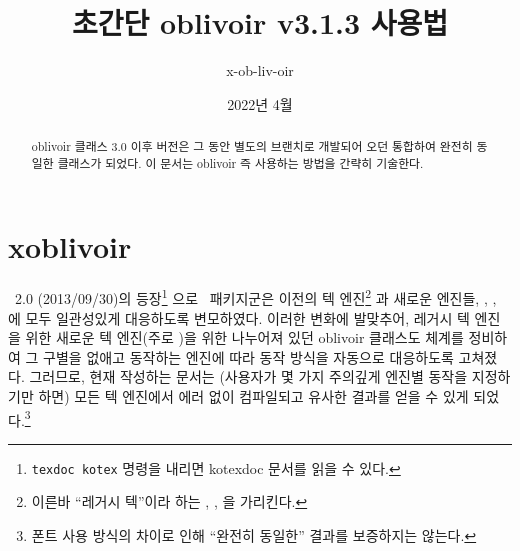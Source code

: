 \documentclass[
	12pt,
	a4paper,
	kosection,
	footnote,
	nobookmarks,
	microtype,
	figtabcapt,
]{oblivoir}
\newcommand\xobclass{x\-ob\-liv\-oir\oblivoirallowbreak}
\newcommand\obclass{ob\-liv\-oir\oblivoirallowbreak}
\begin{document}
\title{초간단 \obclass{} v3.1.3 사용법}

\date{2022년 4월}

\author{x-ob-liv-oir }

\maketitle

\begin{abstract}
\obclass{} 클래스 3.0 이후 버전은 그 동안 별도의 브랜치로 개발되어 오던
  통합하여 완전히 동일한 클래스가 되었다.
이 문서는 \obclass{} 즉 
사용하는 방법을 간략히 기술한다.
\end{abstract}

\tableofcontents*

\clearpage

\section{ \xobclass{}}


\koTeX\ 2.0 (2013/09/30)의 등장\footnote{%
	\texttt{texdoc kotex} 명령을 내리면 kotexdoc 문서를 읽을 수 있다.}%
으로 \koTeX\ 패키지군은 이전의 텍 엔진\footnote{%
	이른바 ``레거시 텍''이라 하는 , , 을
	가리킨다.}%
과 새로운 엔진들, , ,
에 모두 일관성있게 대응하도록 변모하였다.
이러한 변화에 발맞추어, 레거시 텍 엔진을 위한  새로운 텍 엔진(주로 )을 위한 
나누어져 있던 oblivoir 클래스도 체계를 정비하여 그 구별을 없애고 동작하는 엔진에 따라 동작 방식을
자동으로 대응하도록 고쳐졌다. 그러므로, 현재  작성하는 문서는 
(사용자가 몇 가지 주의깊게 엔진별 동작을 지정하기만 하면) 모든 텍 엔진에서 에러 없이 컴파일되고
유사한 결과를 얻을 수 있게 되었다.\footnote{%
	폰트 사용 방식의 차이로 인해 ``완전히 동일한'' 결과를 보증하지는 않는다.}
\end{document}
